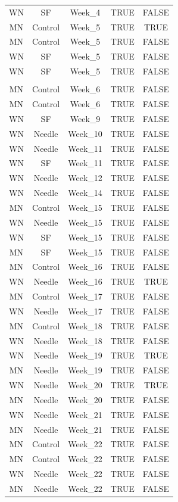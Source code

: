 \documentclass[
  12pt,
  letterpaper,
]{article}
\begin{document}
\begin{longtable}{ccccc}
WN & SF & Week\_4 & TRUE & FALSE \\ 
MN & Control & Week\_5 & TRUE & TRUE \\ 
MN & Control & Week\_5 & TRUE & FALSE \\ 
WN & SF & Week\_5 & TRUE & FALSE \\ 
WN & SF & Week\_5 & TRUE & FALSE \\ 
\midrule\addlinespace[2.5pt]
\multicolumn{5}{l}{Post-Infestion} \\ 
\midrule\addlinespace[2.5pt]
MN & Control & Week\_6 & TRUE & FALSE \\ 
MN & Control & Week\_6 & TRUE & FALSE \\ 
WN & SF & Week\_9 & TRUE & FALSE \\ 
WN & Needle & Week\_10 & TRUE & FALSE \\ 
WN & Needle & Week\_11 & TRUE & FALSE \\ 
WN & SF & Week\_11 & TRUE & FALSE \\ 
WN & Needle & Week\_12 & TRUE & FALSE \\ 
WN & Needle & Week\_14 & TRUE & FALSE \\ 
MN & Control & Week\_15 & TRUE & FALSE \\ 
WN & Needle & Week\_15 & TRUE & FALSE \\ 
WN & SF & Week\_15 & TRUE & FALSE \\ 
MN & SF & Week\_15 & TRUE & FALSE \\ 
MN & Control & Week\_16 & TRUE & FALSE \\ 
WN & Needle & Week\_16 & TRUE & TRUE \\ 
MN & Control & Week\_17 & TRUE & FALSE \\ 
WN & Needle & Week\_17 & TRUE & FALSE \\ 
MN & Control & Week\_18 & TRUE & FALSE \\ 
WN & Needle & Week\_18 & TRUE & FALSE \\ 
WN & Needle & Week\_19 & TRUE & TRUE \\ 
MN & Needle & Week\_19 & TRUE & FALSE \\ 
WN & Needle & Week\_20 & TRUE & TRUE \\ 
MN & Needle & Week\_20 & TRUE & FALSE \\ 
WN & Needle & Week\_21 & TRUE & FALSE \\ 
MN & Needle & Week\_21 & TRUE & FALSE \\ 
MN & Control & Week\_22 & TRUE & FALSE \\ 
MN & Control & Week\_22 & TRUE & FALSE \\ 
WN & Needle & Week\_22 & TRUE & FALSE \\ 
MN & Needle & Week\_22 & TRUE & FALSE \\ 
\bottomrule
\end{longtable}
\end{document}
